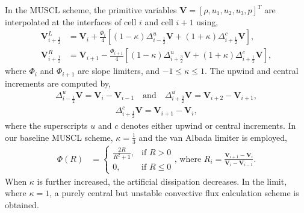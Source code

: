 In the MUSCL scheme, the primitive variables $\mathbf{V}=[\rho, u_{1}, u_{2}, u_{3}, p]^{T}$ are interpolated at the interfaces of cell $i$ and cell $i+1$ using,
\begin{align} 
\mathbf{V}_{i+\frac{1}{2}}^{L}&=\mathbf{V}_{i}+\frac{\Phi_{i} }{4}[(1-\kappa )\Delta _{i-\frac{1}{2}}^{u} \mathbf{V}+(1+\kappa)\Delta_{i+\frac{1}{2}}^{c} \mathbf{V}], \\
\mathbf{V}_{i+\frac{1}{2}}^{R}&=\mathbf{V}_{i+1}-\frac{\Phi_{i+1} }{4}[(1-\kappa )\Delta _{i+\frac{3}{2}}^{u} \mathbf{V}+(1+\kappa)\Delta_{i+\frac{1}{2}}^{c} \mathbf{V}],
\end{align}
where $\Phi_{i}$ and $\Phi_{i+1}$ are slope limiters, and $-1\leq \kappa \leq 1$. The upwind and central increments are computed by,
\begin{align} 
\Delta_{i-\frac{1}{2}}^{u} \mathbf{V}=\mathbf{V}_{i}-\mathbf{V}_{i-1} \quad \text{and} \quad
\Delta_{i+\frac{3}{2}}^{u} \mathbf{V}= \mathbf{V}_{i+2}-\mathbf{V}_{i+1},
\end{align}
\begin{align} 
  \Delta_{i+\frac{1}{2}}^{c} \mathbf{V}= \mathbf{V}_{i+1}-\mathbf{V}_{i},
\end{align}
where the superscripts $u$ and $c$ denotes either upwind or central increments. In our baseline MUSCL scheme, $\kappa=\frac{1}{3}$ and the van Albada limiter is employed,
\begin{align} 
\Phi(R)&=\left\{\begin{matrix}
 \frac{2R}{R^{2}+1}, &\text{if } R>0 \\ 
0, &\text{if } R \leq 0
\end{matrix}\right. {\text {, where }} R_{i}=\frac{\mathbf{V}_{i+1}-\mathbf{V}_{i}}{\mathbf{V}_{i}-\mathbf{V}_{i-1}}.
\label{valimiter}
\end{align}
When $\kappa$ is further increased, the artificial dissipation decreases. In the limit, where $\kappa=1$, a purely central but unstable convective flux calculation scheme is obtained.






